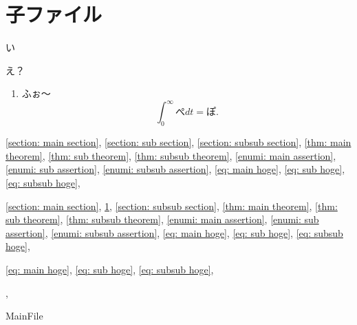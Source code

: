 \documentclass[uplatex,dvipdfmx]{jsarticle}
\begin{document}
\fi

\section{子ファイル}\label{section: sub section}
い
\begin{thm}\label{thm: sub theorem}
  え？
  \begin{enumerate}
    \item \label{enumi: sub assertion}
    ふぉ〜
    \begin{equation}
      \label{eq: sub hoge}
      \int_0^{\infty}\text{ぺ}dt = \text{ぽ}.
      \tag{\(\diamondsuit\)}
    \end{equation}
  \end{enumerate}
\end{thm}


\autoref{section: main section},
\autoref{section: sub section},
\autoref{section: subsub section},
\autoref{thm: main theorem},
\autoref{thm: sub theorem},
\autoref{thm: subsub theorem},
\autoref{enumi: main assertion},
\autoref{enumi: sub assertion},
\autoref{enumi: subsub assertion},
\autoref{eq: main hoge},
\autoref{eq: sub hoge},
\autoref{eq: subsub hoge},

\ref{section: main section},
\ref{section: sub section},
\ref{section: subsub section},
\ref{thm: main theorem},
\ref{thm: sub theorem},
\ref{thm: subsub theorem},
\ref{enumi: main assertion},
\ref{enumi: sub assertion},
\ref{enumi: subsub assertion},
\ref{eq: main hoge},
\ref{eq: sub hoge},
\ref{eq: subsub hoge},

\eqref{eq: main hoge},
\eqref{eq: sub hoge},
\eqref{eq: subsub hoge},

\cite{kashiwara2002sheaves},




\ifcsname MainFile\endcsname\else
\printbibliography
\end{document}
